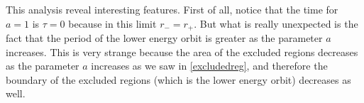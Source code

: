 This analysis reveal interesting features. First of all, notice that the time for $a=1$ is $\tau=0$ because in this limit $r_-=r_+$. But what is really unexpected is the fact that the period of the lower energy orbit is greater as the parameter $a$ increases. This is very strange because the area of the excluded regions decreases as the parameter $a$ increases as we saw in \cref{excludedreg}, and therefore the boundary of the excluded regions (which is the lower energy orbit) decreases as well.